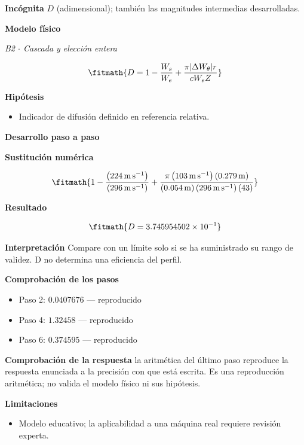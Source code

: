 \documentclass[10pt,openany]{book}
\begin{document}
\noindent\textbf{Incógnita}
$D$ (adimensional); también las magnitudes intermedias desarrolladas.

\noindent\textbf{Modelo físico}

\noindent\textit{B2 \(\cdot\) Cascada y elección entera}

\[
\fitmath{D=1 - \frac{W_s}{W_e} + \frac{\pi |\Delta W_\theta| r}{c W_e Z}}
\]

\noindent\textbf{Hipótesis}
\begin{itemize}
\item Indicador de difusión definido en referencia relativa.
\end{itemize}

\noindent\textbf{Desarrollo paso a paso}



\noindent\textbf{Sustitución numérica}

\[
\fitmath{1 - \frac{\left(224\,\mathrm{m}\,\mathrm{s}^{-1}\right)}{\left(296\,\mathrm{m}\,\mathrm{s}^{-1}\right)} + \frac{\pi \left(103\,\mathrm{m}\,\mathrm{s}^{-1}\right) \left(0.279\,\mathrm{m}\right)}{\left(0.054\,\mathrm{m}\right) \left(296\,\mathrm{m}\,\mathrm{s}^{-1}\right) \left(43\right)}}
\]

\noindent\textbf{Resultado}

\[
\fitmath{D=3.745954502\times10^{-1}}
\]

\noindent\textbf{Interpretación}
Compare con un límite solo si se ha suministrado su rango de validez. D no determina una eficiencia del perfil.

\noindent\textbf{Comprobación de los pasos}
\begin{itemize}
\item Paso 2: $0.0407676$ — reproducido
\item Paso 4: $1.32458$ — reproducido
\item Paso 6: $0.374595$ — reproducido
\end{itemize}

\noindent\textbf{Comprobación de la respuesta} la aritmética del último paso reproduce la respuesta enunciada a la precisión con que está escrita. Es una reproducción aritmética; no valida el modelo físico ni sus hipótesis.

\noindent\textbf{Limitaciones}
\begin{itemize}
\item Modelo educativo; la aplicabilidad a una máquina real requiere revisión experta.
\end{itemize}
\end{document}
